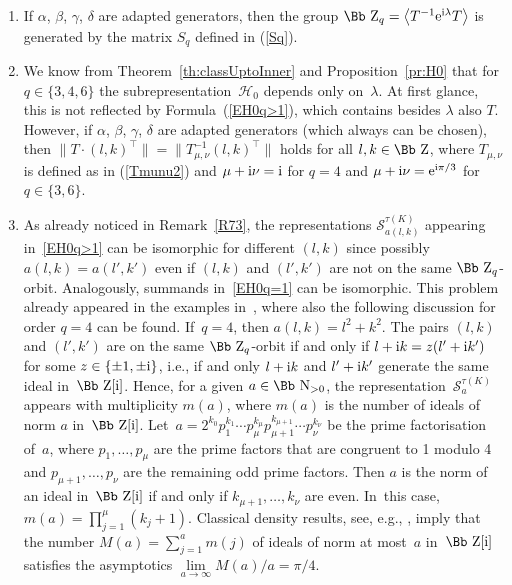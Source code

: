 \documentclass[pdftex]{sigma}
\newcommand\NN{{\mbox{\Bb N}}}
\newcommand\ZZ{{\mbox{\Bb Z}}}
\newcommand\cH{{\mathcal H}}
\newcommand\la{\langle}
\newcommand\ra{\rangle}
\numberwithin{equation}{section}
\begin{document}
\begin{Remark}\label{fR}\quad
\begin{enumerate}\itemsep=0pt
\item If $\alpha$, $\beta$, $\gamma$, $\delta$ are adapted generators, then the group $\ZZ_q=\big\la T^{-1} {\rm e}^{{\rm i}\lambda} T\big\ra$ is generated by the matrix $S_q$ defined in (\ref{Sq}).
\item We know from Theorem~\ref{th:classUptoInner} and Proposition~\ref{pr:H0} that
for $q\in\{3,4,6\}$ the subrepresentation~$\cH_0$ depends only on~$\lambda$. At first glance, this is not reflected by Formula~(\ref{EH0q>1}), which contains besides $\lambda$ also $T$. However, if $\alpha$, $\beta$, $\gamma$, $\delta$ are adapted generators (which always can be chosen), then
$\big\| T\cdot(l,k)^\top \big\|=\big\|T_{\mu,\nu}^{-1}(l,k)^\top\big\|$ holds for all $l,k\in\ZZ$, where $T_{\mu,\nu}$ is defined as in (\ref{Tmunu2}) and $\mu+{\rm i}\nu={\rm i}$ for $q=4$ and $\mu+{\rm i}\nu={\rm e}^{{\rm i}\pi/3}$ for $q\in\{3,6\}$.
\item As already noticed in Remark~\ref{R73}, the representations ${\mathcal S}_{a(l,k)}^{\tau(K)}$ appearing in~\eqref{EH0q>1} can be isomorphic for different $(l,k)$ since possibly $a(l,k)=a(l',k')$ even if $(l,k)$ and $(l',k')$ are not on the same $\ZZ_q$-orbit. Analogously, summands in~\eqref{EH0q=1} can be isomorphic. This problem already appeared in the examples in~\cite{Br}, where also the following discussion for order $q=4$ can be found. If~$q=4$, then $a(l,k)=l^2+k^2$. The pairs $(l,k)$ and $(l',k')$ are on the same $\ZZ_q$-orbit if and only if $l+{\rm i}k=z(l'+{\rm i}k')$ for some $z\in\{\pm1,\pm {\rm i}\}$, i.e., if and only $l+{\rm i}k$ and $l'+{\rm i}k'$ generate the same ideal in~$\ZZ[{\rm i}]$. Hence, for a given $a\in\NN_{>0}$, the representation~${\mathcal S}_a^{\tau(K)}$ appears with multiplicity $m(a)$, where $m(a)$ is the number of ideals of norm $a$ in~$\ZZ[{\rm i}]$. Let~$a=2^{k_0}p_1^{k_1}\cdots p_\mu^{k_\mu} p_{\mu+1}^{k_{\mu+1}} \cdots p_\nu^{k_\nu}$ be the prime factorisation of~$a$, where $p_1,\dots, p_\mu$ are the prime factors that are congruent to 1 modulo 4 and $p_{\mu+1},\dots,p_\nu$ are the remaining odd prime factors. Then $a$ is the norm of an ideal in~$\ZZ[{\rm i}]$ if and only if $k_{\mu+1},\dots,k_\nu$ are even. In~this case, $m(a)=\prod_{j=1}^\mu(k_j+1)$. Classical density results, see, e.g., \cite[Section~40]{H}, imply that the number $M(a)=\sum_{j=1}^a m(j)$ of ideals of norm at most~$a$ in~$\ZZ[{\rm i}]$ satisfies the asymptotics $\lim\limits_{a\to \infty}M(a)/a=\pi/4$.
\end{enumerate}
\end{Remark}
\end{document}
